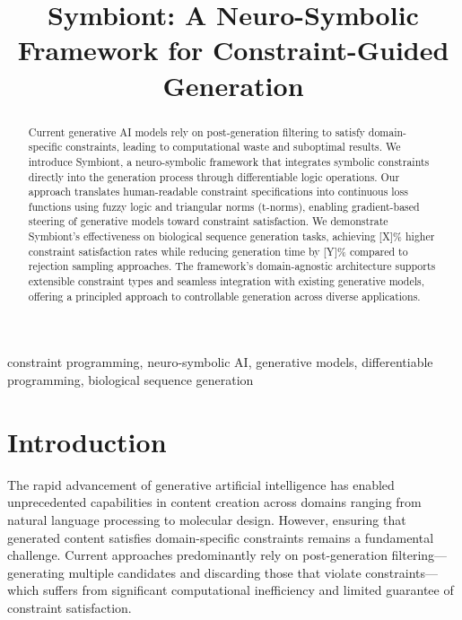 \documentclass[conference]{IEEEtran}
\begin{document}
\title{Symbiont: A Neuro-Symbolic Framework for Constraint-Guided Generation}

\author{
}

\maketitle

\begin{abstract}
Current generative AI models rely on post-generation filtering to satisfy domain-specific constraints, leading to computational waste and suboptimal results. We introduce Symbiont, a neuro-symbolic framework that integrates symbolic constraints directly into the generation process through differentiable logic operations. Our approach translates human-readable constraint specifications into continuous loss functions using fuzzy logic and triangular norms (t-norms), enabling gradient-based steering of generative models toward constraint satisfaction. We demonstrate Symbiont's effectiveness on biological sequence generation tasks, achieving [X]\% higher constraint satisfaction rates while reducing generation time by [Y]\% compared to rejection sampling approaches. The framework's domain-agnostic architecture supports extensible constraint types and seamless integration with existing generative models, offering a principled approach to controllable generation across diverse applications.
\end{abstract}

\begin{IEEEkeywords}
constraint programming, neuro-symbolic AI, generative models, differentiable programming, biological sequence generation
\end{IEEEkeywords}

\section{Introduction}

The rapid advancement of generative artificial intelligence has enabled unprecedented capabilities in content creation across domains ranging from natural language processing to molecular design. However, ensuring that generated content satisfies domain-specific constraints remains a fundamental challenge. Current approaches predominantly rely on post-generation filtering—generating multiple candidates and discarding those that violate constraints—which suffers from significant computational inefficiency and limited guarantee of constraint satisfaction.
\end{document}
